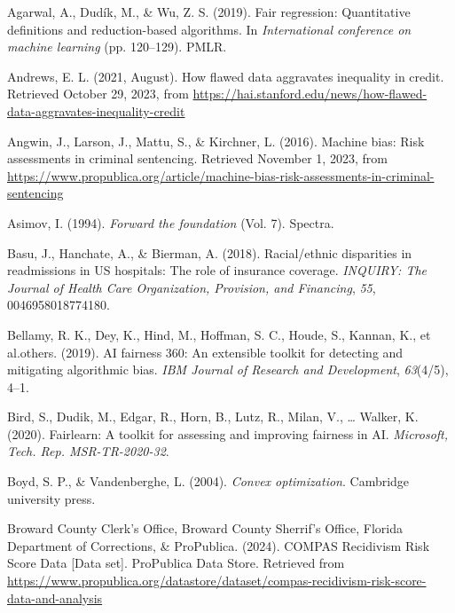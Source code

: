 \documentclass[12pt, twoside]{amherstthesis}
\newenvironment{CSLReferences}[2]%
  {}%
  {\par}
\begin{document}
\hypertarget{refs}{}
\begin{CSLReferences}{1}{0}
\leavevmode{}%
Agarwal, A., Dudík, M., \& Wu, Z. S. (2019). Fair regression: Quantitative definitions and reduction-based algorithms. In \emph{International conference on machine learning} (pp. 120--129). PMLR.

\leavevmode{}%
Andrews, E. L. (2021, August). How flawed data aggravates inequality in credit. Retrieved October 29, 2023, from \url{https://hai.stanford.edu/news/how-flawed-data-aggravates-inequality-credit}

\leavevmode{}%
Angwin, J., Larson, J., Mattu, S., \& Kirchner, L. (2016). Machine bias: Risk assessments in criminal sentencing. Retrieved November 1, 2023, from \url{https://www.propublica.org/article/machine-bias-risk-assessments-in-criminal-sentencing}

\leavevmode{}%
Asimov, I. (1994). \emph{Forward the foundation} (Vol. 7). Spectra.

\leavevmode{}%
Basu, J., Hanchate, A., \& Bierman, A. (2018). Racial/ethnic disparities in readmissions in US hospitals: The role of insurance coverage. \emph{INQUIRY: The Journal of Health Care Organization, Provision, and Financing}, \emph{55}, 0046958018774180.

\leavevmode{}%
Bellamy, R. K., Dey, K., Hind, M., Hoffman, S. C., Houde, S., Kannan, K., et al.others. (2019). AI fairness 360: An extensible toolkit for detecting and mitigating algorithmic bias. \emph{IBM Journal of Research and Development}, \emph{63}(4/5), 4--1.

\leavevmode{}%
Bird, S., Dudik, M., Edgar, R., Horn, B., Lutz, R., Milan, V., \ldots{} Walker, K. (2020). Fairlearn: A toolkit for assessing and improving fairness in AI. \emph{Microsoft, Tech. Rep. MSR-TR-2020-32}.

\leavevmode{}%
Boyd, S. P., \& Vandenberghe, L. (2004). \emph{Convex optimization}. Cambridge university press.

\leavevmode{}%
Broward County Clerk's Office, Broward County Sherrif's Office, Florida Department of Corrections, \& ProPublica. (2024). {COMPAS Recidivism Risk Score Data} {[}Data set{]}. ProPublica Data Store. Retrieved from \url{https://www.propublica.org/datastore/dataset/compas-recidivism-risk-score-data-and-analysis}


\end{CSLReferences}
\end{document}
